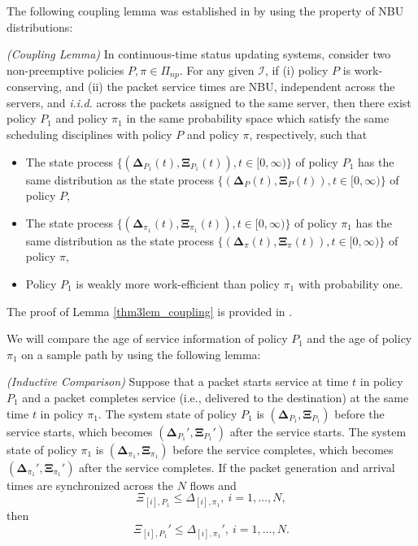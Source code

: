The following coupling lemma was established in \cite{sun2017delay} by using the property of NBU distributions:
\begin{lemma}\emph{(Coupling Lemma)} \cite[Lemma 2]{sun2017delay}\label{thm3lem_coupling}
In continuous-time status updating systems, consider two non-preemptive policies $P,\pi\in \Pi_{np}$. For any given $\mathcal{I}$, if (i) policy $P$ is work-conserving, and (ii) the packet service times are NBU, independent across the servers, and \emph{i.i.d.} across  the packets assigned to the same server, then there exist policy $P_1$ and  policy $\pi_1$ in the same probability space which satisfy the same scheduling disciplines with policy $P$ and policy $\pi$, respectively,  such that 
\begin{itemize}
\itemsep0em 
\item[1.] The state process $\{(\bm\Delta_{P_1}(t),\bm\Xi_{P_1}(t)),t\in [0,\infty)\}$ of policy $P_1$ has the same distribution as the state process $\{(\bm\Delta_{P}(t),\bm\Xi_{P}(t)),t\in [0,\infty)\}$ of policy $P$,
\item[2.] The state process $\{(\bm\Delta_{\pi_1}(t),\bm\Xi_{\pi_1}(t)),t\in [0,\infty)\}$ of policy $\pi_1$ has the same distribution as the state process $\{(\bm\Delta_{\pi}(t),\bm\Xi_{\pi}(t)),t\in [0,\infty)\}$  of policy $\pi$,
\item[3.] Policy $P_1$ is weakly more work-efficient than policy $\pi_1$ with probability one. 
\end{itemize} 
\end{lemma}
The proof of Lemma \ref{thm3lem_coupling} is provided in \cite{sun2017delay}.



We will compare the age of service information of policy $P_1$ and the age of policy $\pi_1$ on a sample path by using the following lemma:

\begin{lemma} \emph{(Inductive Comparison)}\label{thm3lem2}
Suppose that a packet starts service at time $t$ in policy $P_1$ and a packet completes service (i.e., delivered to the destination)  at the same time $t$ in policy $\pi_1$. The system state  of policy $P_1$ is $(\bm\Delta_{P_1},\bm\Xi_{P_1})$ before the service starts, which becomes $(\bm\Delta_{P_1}',\bm\Xi_{P_1}')$ after the service starts. The system state  of policy $\pi_1$ is $(\bm\Delta_{\pi_1},\bm\Xi_{\pi_1})$ before the service completes, which becomes $(\bm\Delta_{\pi_1}',\bm\Xi_{\pi_1}')$ after the service completes.
 If the packet generation and arrival times are {synchronized} across the $N$ flows and
\begin{equation}\label{thm3hyp1}
 \Xi_{[i],P_1} \leq \Delta_{[i],\pi_1},~i=1,\ldots,N,
\end{equation}
then
\begin{equation}\label{thm3law6}
\Xi_{[i],P_1}' \leq \Delta_{[i],\pi_1}',~i=1,\ldots,N.
\end{equation}  
\end{lemma}


